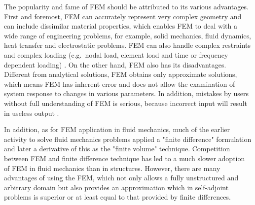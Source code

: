The popularity and fame of FEM should be attributed to its various advantages. First and foremost, FEM can accurately represent very complex geometry and can include dissimilar material properties, which enables FEM to deal with a wide range of engineering problems, for example, solid mechanics, fluid dynamics, heat transfer and electrostatic problems. FEM can also handle complex restraints and complex loading (e.g.\ nodal load, element load and time or frequency dependent loading) \cite{deweck2004}. On the other hand, FEM also has its disadvantages. Different from analytical solutions, FEM obtains only approximate solutions, which means FEM has inherent error and does not allow the examination of system response to changes in various parameters. In addition, mistakes by users without full understanding of FEM is serious, because incorrect input will result in useless output \cite{prawoto2013integration, reddy1993introduction}. 

In addition, as for FEM application in fluid mechanics, much of the earlier activity to solve fluid mechanics problems applied a "finite difference" formulation and later a derivative of this as the "finite volume" technique. Competition between FEM and finite difference technique has led to a much slower adoption of FEM in fluid mechanics than in structures. However, there are many advantages of using the FEM, which not only allows a fully unstructured and arbitrary domain but also provides an approximation which in self-adjoint problems is superior or at least equal to that provided by finite differences. \cite{Zienkiewicz2014b}






